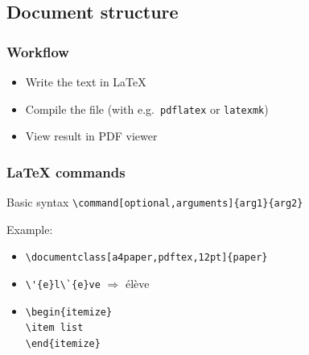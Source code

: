 \documentclass{beamer}
\begin{document}
\subsection{Document structure}

\begin{frame}
  \frametitle{Workflow}

  \begin{itemize}
  \item<+-> Write the text in {\LaTeX}
  \item<+-> Compile the file (with e.g.~\texttt{pdflatex} or \texttt{latexmk})
  \item<+-> View result in PDF viewer
  \end{itemize}
\end{frame}

\begin{frame}[fragile]
  \frametitle{{\LaTeX} commands}

  \begin{block}{Basic syntax}
  \verb|\command[optional,arguments]{arg1}{arg2}|
  \end{block}

  \pause

  Example:

  \begin{itemize}
  \item<+-> \verb|\documentclass[a4paper,pdftex,12pt]{paper}|
  \item<+-> \verb|\'{e}l\`{e}ve| $\Rightarrow$ \'el\`eve
  \item<+-> \verb|\begin{itemize}|\\
            \verb|\item list|\\
            \verb|\end{itemize}|
  \end{itemize}

\end{frame}
\end{document}
